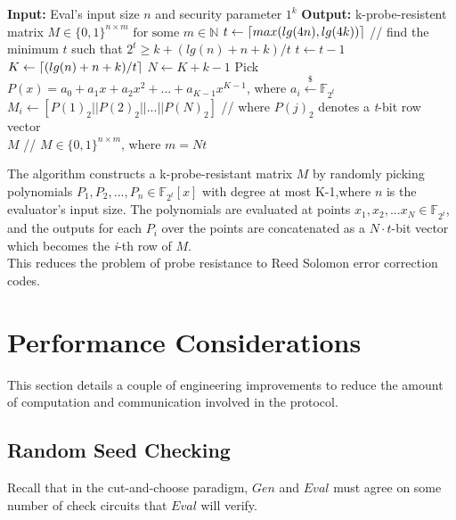 \documentclass{article}
\DeclarePairedDelimiter{\ceil}{\lceil}{\rceil}
\begin{document}
\begin{algorithm}
\label{k-probe-matrix}
\begin{algorithmic}
\State \textbf{Input:} Eval's input size $n$ and security parameter $1^{k}$
\State \textbf{Output:} k-probe-resistent matrix $M \in \{0,1\}^{n \times m} \text{ for some } m \in \mathbb{N}$
\State $t \leftarrow \ceil{max(lg(4n),lg(4k))}$ // find the minimum $t$ such that $2^{t} \geq k + (lg(n) + n + k)/t$
	\State $t \leftarrow t - 1$
\EndWhile
\State $K \leftarrow \ceil{(lg(n) + n + k)/t}$
\State $N \leftarrow K + k - 1$
	\State Pick $P(x) = a_{0} + a_{1}x + a_{2}x^{2} + ... + a_{K-1}x^{K-1}$, where $a_{i} \xleftarrow{\$} \mathbb{F}_{2^{t}}$
	\State $M_{i} \leftarrow [P(1)_{2} || P(2)_{2} || ... || P(N)_{2}]$ // where $P(j)_{2}$ denotes a \emph{t}-bit row vector
\EndFor \\ 
\Return $M$ // $M \in \{0,1\}^{n \times m}$, where $m=Nt$
\end{algorithmic}
\end{algorithm}

The algorithm constructs a k-probe-resistant matrix $M$ by randomly picking polynomials $P_1,P_2,...,P_n \in \mathbb{F}_{2^{t}}[x]$ with degree at most K-1,where $n$ is the evaluator's input size. The polynomials are evaluated at points $x_1,x_2,...x_N \in \mathbb{F}_{2^{t}}$,  and the outputs for each $P_i$ over the points are concatenated as a $N \cdot t$-bit vector which becomes the \emph{i}-th row of $M$.\\

This reduces the problem of probe resistance to Reed Solomon error correction codes.

\section{Performance Considerations}
This section details a couple of engineering improvements to reduce the amount of computation and communication involved in the protocol.

\subsection{Random Seed Checking}
Recall that in the cut-and-choose paradigm, $Gen$ and $Eval$ must agree on some number of check circuits that $Eval$ will verify.
\end{document}
